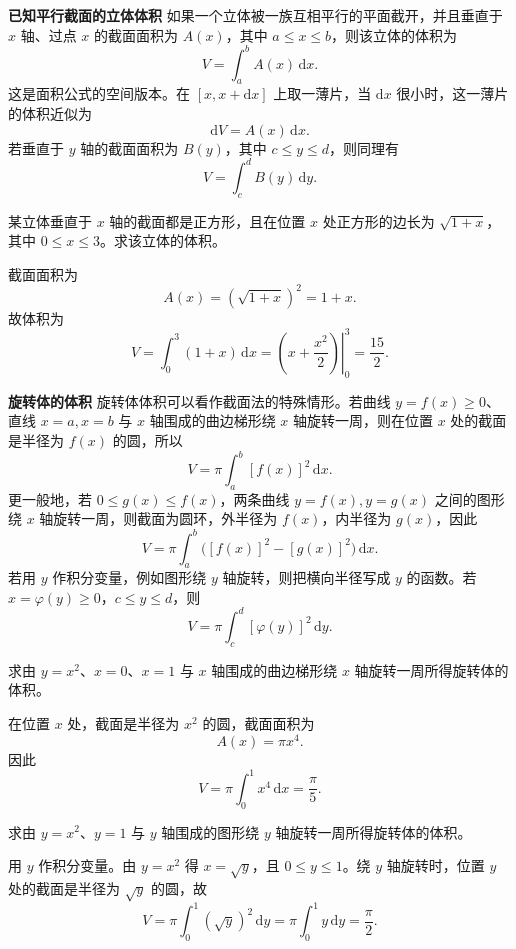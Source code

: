 \documentclass[fontset=fandol]{ctexart}
\newenvironment{custom}[1]{\par\noindent\textbf{#1}\quad}{\par\vspace{0.8em}}
\newcommand{\dd}{\mathrm{d}}
\begin{document}
\begin{custom}{已知平行截面的立体体积}
如果一个立体被一族互相平行的平面截开，并且垂直于 $x$ 轴、过点 $x$ 的截面面积为 $A(x)$，其中 $a\leq x\leq b$，则该立体的体积为
\[
V=\int_a^b A(x)\,\dd x.
\]
这是面积公式的空间版本。在 $[x,x+\dd x]$ 上取一薄片，当 $\dd x$ 很小时，这一薄片的体积近似为
\[
\dd V=A(x)\,\dd x.
\]
若垂直于 $y$ 轴的截面面积为 $B(y)$，其中 $c\leq y\leq d$，则同理有
\[
V=\int_c^d B(y)\,\dd y.
\]
\end{custom}

\begin{example}[已知截面积求体积]
某立体垂直于 $x$ 轴的截面都是正方形，且在位置 $x$ 处正方形的边长为 $\sqrt{1+x}$，其中 $0\leq x\leq3$。求该立体的体积。

截面面积为
\[
A(x)=(\sqrt{1+x})^2=1+x.
\]
故体积为
\[
V=\int_0^3(1+x)\,\dd x
=\left.\left(x+\frac{x^2}{2}\right)\right|_0^3
=\frac{15}{2}.
\]
\end{example}

\begin{custom}{旋转体的体积}
旋转体体积可以看作截面法的特殊情形。若曲线 $y=f(x)\geq0$、直线 $x=a,x=b$ 与 $x$ 轴围成的曲边梯形绕 $x$ 轴旋转一周，则在位置 $x$ 处的截面是半径为 $f(x)$ 的圆，所以
\[
V=\pi\int_a^b [f(x)]^2\,\dd x.
\]
更一般地，若 $0\leq g(x)\leq f(x)$，两条曲线 $y=f(x),y=g(x)$ 之间的图形绕 $x$ 轴旋转一周，则截面为圆环，外半径为 $f(x)$，内半径为 $g(x)$，因此
\[
V=\pi\int_a^b\bigl([f(x)]^2-[g(x)]^2\bigr)\,\dd x.
\]
若用 $y$ 作积分变量，例如图形绕 $y$ 轴旋转，则把横向半径写成 $y$ 的函数。若 $x=\varphi(y)\geq0$，$c\leq y\leq d$，则
\[
V=\pi\int_c^d [\varphi(y)]^2\,\dd y.
\]
\end{custom}

\begin{example}[绕 $x$ 轴旋转]
求由 $y=x^2$、$x=0$、$x=1$ 与 $x$ 轴围成的曲边梯形绕 $x$ 轴旋转一周所得旋转体的体积。

在位置 $x$ 处，截面是半径为 $x^2$ 的圆，截面面积为
\[
A(x)=\pi x^4.
\]
因此
\[
V=\pi\int_0^1x^4\,\dd x=\frac{\pi}{5}.
\]
\end{example}

\begin{example}[绕 $y$ 轴旋转]
求由 $y=x^2$、$y=1$ 与 $y$ 轴围成的图形绕 $y$ 轴旋转一周所得旋转体的体积。

用 $y$ 作积分变量。由 $y=x^2$ 得 $x=\sqrt y$，且 $0\leq y\leq1$。绕 $y$ 轴旋转时，位置 $y$ 处的截面是半径为 $\sqrt y$ 的圆，故
\[
V=\pi\int_0^1(\sqrt y)^2\,\dd y
=\pi\int_0^1y\,\dd y
=\frac{\pi}{2}.
\]
\end{example}
\end{document}
